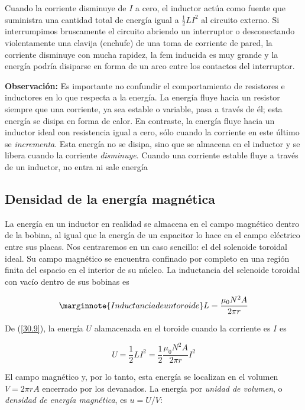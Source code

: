 Cuando la corriente disminuye de $I$ a cero, el inductor actúa como fuente que suministra una cantidad total de energía igual a $\frac{1}{2}LI^2$ al circuito externo. Si interrumpimos bruscamente el circuito abriendo un interruptor o desconectando violentamente una clavija (enchufe) de una toma de corriente de pared, la corriente disminuye con mucha rapidez, la fem inducida es muy grande y la energía podría disiparse en forma de un arco entre los contactos del interruptor.

\textbf{Observación:} Es importante no confundir el comportamiento de resistores e inductores en lo que respecta a la energía. La energía fluye hacia un resistor siempre que una corriente, ya sea estable o variable, pasa a través de él; esta energía se disipa en forma de calor. En contraste, la energía fluye hacia un inductor ideal con resistencia igual a cero, sólo cuando la corriente en este último se \textit{incrementa}. Esta energía no se disipa, sino que se almacena en el inductor y se libera cuando la corriente \textit{disminuye}. Cuando una corriente estable fluye a través de un inductor, no entra ni sale energía

\subsection{Densidad de la energía magnética}
La energía en un inductor en realidad se almacena en el campo magnético dentro de la bobina, al igual que la energía de un capacitor lo hace en el campo eléctrico entre sus placas. Nos centraremos en un caso sencillo: el del solenoide toroidal ideal. Su campo magnético se encuentra confinado por completo en una región finita del espacio en el interior de su núcleo. La inductancia del selenoide toroidal con vacío dentro de sus bobinas es 

\begin{equation}\label{L de un toroide}\marginnote{Inductancia de un toroide}
L=\frac{\mu_0N^2A}{2\pi r}
\end{equation}

De (\ref{30.9}), la energía $U$ alamacenada en el toroide  cuando la corriente es $I$ es

\begin{equation*}
U=\frac{1}{2}LI^2=\frac{1}{2}\frac{\mu_0N^2A}{2\pi r}I^2
\end{equation*}

El campo magnético y, por lo tanto, esta energía se localizan en el volumen $V=2\pi rA$ encerrado por los devanados. La energía por \textit{unidad de volumen}, o \textit{densidad de energía magnética}, es $u=U/V$:

